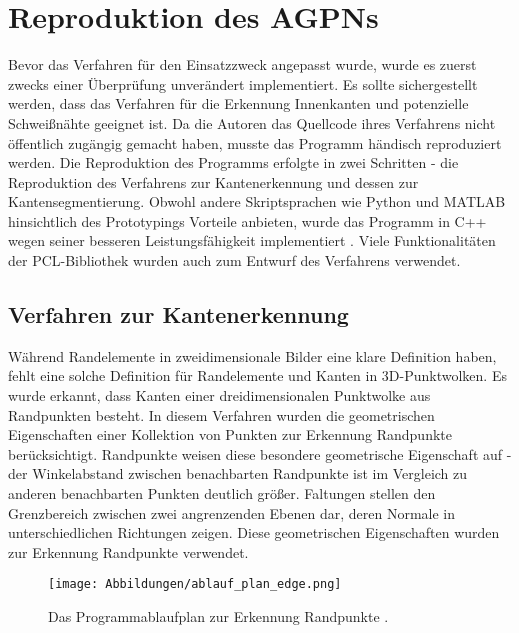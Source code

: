 \section{Reproduktion des AGPNs}
Bevor das Verfahren für den Einsatzzweck angepasst wurde, wurde es zuerst zwecks einer Überprüfung unverändert implementiert. Es sollte sichergestellt werden, dass das Verfahren für die Erkennung Innenkanten und potenzielle Schweißnähte geeignet ist. Da die Autoren das Quellcode ihres Verfahrens nicht öffentlich zugängig gemacht haben, musste das Programm händisch reproduziert werden. Die Reproduktion des Programms erfolgte in zwei Schritten - die Reproduktion des Verfahrens zur Kantenerkennung und dessen zur Kantensegmentierung. Obwohl andere Skriptsprachen wie Python und MATLAB hinsichtlich des Prototypings Vorteile anbieten, wurde das Programm in C++ wegen seiner besseren Leistungsfähigkeit implementiert \autocite{svensson_performance_2021}. Viele Funktionalitäten der PCL-Bibliothek \autocite{rusu_3d_2011} wurden auch zum Entwurf des Verfahrens verwendet.

\subsection{Verfahren zur Kantenerkennung} \label{edge_detection_reprod}
Während Randelemente in zweidimensionale Bilder eine klare Definition haben, fehlt eine solche Definition für Randelemente und Kanten in 3D-Punktwolken. Es wurde erkannt, dass Kanten einer dreidimensionalen Punktwolke aus Randpunkten besteht. In diesem Verfahren wurden die geometrischen Eigenschaften einer Kollektion von Punkten zur Erkennung Randpunkte berücksichtigt. Randpunkte weisen diese besondere geometrische Eigenschaft auf - der Winkelabstand zwischen benachbarten Randpunkte ist im Vergleich zu anderen benachbarten Punkten deutlich größer. Faltungen stellen den Grenzbereich zwischen zwei angrenzenden Ebenen dar, deren Normale in unterschiedlichen Richtungen zeigen. Diese geometrischen Eigenschaften wurden zur Erkennung Randpunkte verwendet. \autocite[1-2]{ni_edge_2016}

\begin{figure}[h]
	\texttt{[image: Abbildungen/ablauf\_plan\_edge.png]}
	\centering
	\caption{Das Programmablaufplan zur Erkennung Randpunkte \autocite{ni_edge_2016}.}
	\label{flow_chart}
\end{figure}

